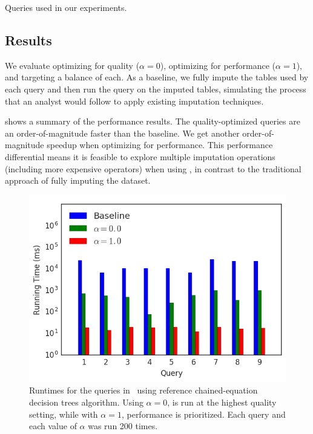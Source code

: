 \begin{table}
  \centering
  
  \vspace{1ex}
  \caption{Queries used in our experiments.}\label{tbl:queries}
\end{table}

%  

\subsection{Results}\label{sec:results}

We evaluate \ProjectName{} optimizing for quality ($\alpha=0$), optimizing for performance
($\alpha=1$), and targeting a balance of each. As a baseline, we fully impute the tables
used by each query and then run the query on the imputed tables, simulating the process that
an analyst would follow to apply existing imputation techniques.

 shows a summary of the performance results. The quality-optimized
queries are an order-of-magnitude faster than the baseline. We get another order-of-magnitude speedup when optimizing for performance. This performance
differential means it is feasible
to explore multiple imputation operations (including more expensive operators) when using
\ProjectName{}, in contrast to the traditional approach of fully imputing the dataset.

\begin{figure}
\includegraphics[width=\columnwidth]{figures/running_times_combined_bar.png}
\caption{Runtimes for the queries in~ using reference
    chained-equation decision trees algorithm. Using $\alpha=0$, \ProjectName{}
    is run at the highest quality setting, while with $\alpha=1$, performance
    is prioritized. Each query and each value of $\alpha$ was run 200 times.}
\label{fig:runtimes}
\end{figure}

